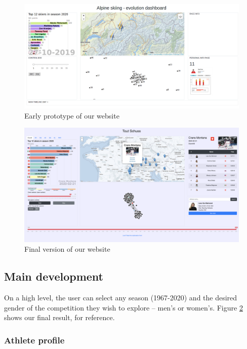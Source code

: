 \begin{figure}[ht!]
    \centering
    \includegraphics[width=\linewidth]{img/prototype.png}
    \caption{Early prototype of our website}
    \label{fig:prototype}
\end{figure}

\begin{figure}[ht!]
    \centering
    \includegraphics[width=\linewidth]{img/website.png}
    \caption{Final version of our website}
    \label{fig:final_website}
\end{figure}

\subsection{Main development}

On a high level, the user can select any season (1967-2020) and the desired gender of the competition they wish to explore -- men's or women's.
Figure \ref{fig:final_website} shows our final result, for reference.

\subsubsection{Athlete profile}
\label{sec:profile}

